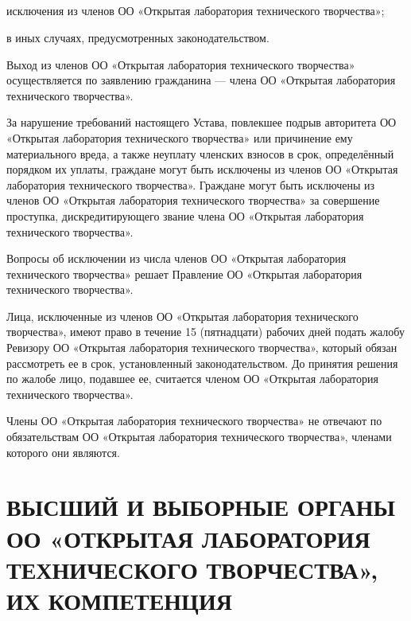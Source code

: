 \documentclass[a4paper,fontsize=14pt,titlepage]{scrartcl}
\makeatletter
\newenvironment{numberedpars}{%
  \addtocounter{secnumdepth}{1}
  \renewcommand\theparagraph{\arabic{section}.\arabic{paragraph}}
  \renewcommand\@seccntformat[1]
  {\expandafter\ifx\csname##1\endcsname\paragraph\csname 
  the##1\endcsname\else\csname the##1\endcsname\quad\fi}
  \let\old@par=\par
  \def\new@par{\let\par=\old@par\paragraph{}\let\par=\new@par}
  \let\par=\new@par
  \par
}{
  \addtocounter{secnumdepth}{-1}
}
\newenvironment{numberedsubpars}{%
  \addtocounter{secnumdepth}{1}
  \renewcommand\thesubparagraph{\arabic{section}.\arabic{paragraph}.\arabic{subparagraph}}
  \renewcommand\@seccntformat[1]
  {\expandafter\ifx\csname##1\endcsname\subparagraph\csname 
  the##1\endcsname\else\csname the##1\endcsname\quad\fi}
  \let\old@@par=\par
  \def\new@@par{\let\par=\old@par\subparagraph{}\let\par=\new@@par}
  \let\par=\new@@par
  \par
}{
  \addtocounter{secnumdepth}{-1}
  \let\par=\old@@par
}
\let\@@@section=\section
\renewcommand\section[1]{\@@@section{\MakeUppercase{#1}}}
\makeatother
\begin{document}
\begin{numberedpars}
\begin{numberedsubpars}
исключения из членов ОО «Открытая лаборатория технического творчества»;

в иных случаях, предусмотренных законодательством.
\end{numberedsubpars}

Выход из членов ОО «Открытая лаборатория технического творчества» осуществляется по заявлению гражданина — члена ОО
«Открытая лаборатория технического творчества».

За нарушение требований настоящего Устава, повлекшее подрыв авторитета ОО «Открытая лаборатория технического творчества»
или причинение ему материального вреда, а также неуплату членских взносов в срок, определённый порядком их уплаты,
граждане могут быть исключены из членов ОО «Открытая лаборатория технического творчества». Граждане могут быть исключены
из членов ОО «Открытая лаборатория технического творчества» за совершение проступка, дискредитирующего звание члена ОО
«Открытая лаборатория технического творчества».

Вопросы об исключении из числа членов ОО «Открытая лаборатория технического творчества» решает Правление ОО «Открытая
лаборатория технического творчества».

Лица, исключенные из членов ОО «Открытая лаборатория технического творчества», имеют право в течение 15 (пятнадцати)
рабочих дней подать жалобу Ревизору ОО «Открытая лаборатория технического творчества», который обязан рассмотреть ее в
срок, установленный законодательством. До принятия решения по жалобе лицо, подавшее ее, считается членом ОО «Открытая
лаборатория технического творчества».

Члены ОО «Открытая лаборатория технического творчества» не отвечают по обязательствам ОО «Открытая лаборатория
технического творчества», членами которого они являются.
\end{numberedpars}

\section{Высший и выборные органы ОО «Открытая лаборатория технического творчества», их компетенция}
\end{document}
